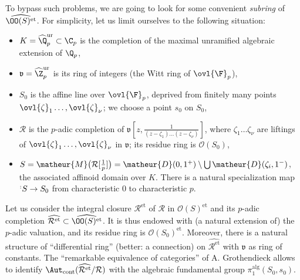 \begin{para}\label{para:r}
 To bypass such problems, we are going to look for some convenient {\it subring} of
 $\widehat{\OO(S)^{\mathrm{et}}}$.
 For simplicity, let us limit ourselves to the following situation:
 \begin{itemize}
  \item $K = {\widehat{\Q}}^{\mathrm{ur}}_p \subset \C_p$
	is the completion of
	the maximal unramified algebraic extension of ${\Q}_p$,
  \item $\mathfrak{v} = {\widehat{\Z}}^{\mathrm{ur}}_p$ is its ring of
	integers (the Witt ring of ${\ovl{\F}}_p$),
  \item $S_0$ is the affine line over ${\ovl{\F}}_p$, deprived from
	finitely many points ${\ovl{\zeta}}_1\ldots,{\ovl{\zeta}}_{\nu}$;
	we choose a point $s_0$ on $S_0$,
  \item $\mathcal{R}$ is the $p$-adic completion of
	$\mathfrak{v}[z, \frac{1}{(z-\zeta_1)\ldots (z-\zeta_{\nu})}]$,
	where $\zeta_1\ldots \zeta_{\nu}$ are liftings of
	${\ovl{\zeta}}_1\ldots,{\ovl{\zeta}}_{\nu}$ in $\mathfrak{v}$; its
	residue ring is $\mathcal{O}(S_0)$,
  \item $S = \matheur{M}\bigl(\mathcal{R}[\frac{1}{p}]\bigr) =
	\matheur{D}(0,1^+) \setminus \bigcup 
	\matheur{D}(\zeta_i,1^-)$, the associated affinoid domain over $K$.
	There is a natural specialization map $\sp: S \rightarrow S_0$ from
	characteristic $0$ to characteristic $p$.
 \end{itemize}

 Let us consider the integral closure ${\mathcal{R}^{\mathrm{et}}}$ of
 $\mathcal{R}$ in ${\mathcal{O}(S)^{\mathrm{et}}}$ and its $p$-adic
 completion $\widehat{\mathcal{R}^{\mathrm{et}}} \subset
 \widehat{\OO(S)^{\mathrm{et}}}$.
 It is thus endowed with (a natural extension of) the $p$-adic
 valuation, and its residue ring is
 $\mathcal{O}(S_0)^{\mathrm{et}}$. Moreover, there is a natural
 structure of ``differential ring'' (better: a connection) on
 $\widehat{\mathcal{R}^{\mathrm{et}}}$ with $\mathfrak{v}$ as ring of
 constants. The ``remarkable equivalence of categories'' of
 A. Grothendieck \cite[18.1.2]{ega44} allows to identify
 $\Aut_{\mathrm{cont}}(\widehat{\mathcal{R}^{\mathrm{et}}}/\mathcal{R})$
 with the algebraic fundamental group $\pi_1^{\mathrm{alg}}(S_0,s_0)$.
\end{para}

